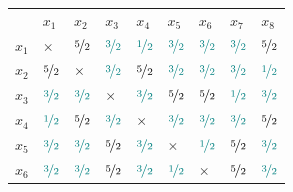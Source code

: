 \documentclass[12pt]{article}
\begin{document}
\begin{enumerate}[leftmargin=\labelsep]
        \begin{table}[h]
          \setlength{\tabcolsep}{5pt} %
          \renewcommand{\arraystretch}{1.35} %
          \centering
          \label{tab:my-table}
          \begin{tabular}{lllllllll}
                  & $x_1$                               & $x_2$                               & $x_3$                               & $x_4$                               & $x_5$                               & $x_6$                               & $x_7$                               & $x_8$                               \\
            $x_1$ & $\times$                            & $\nicefrac{5}{2}$                   & $\textcolor{teal}{\nicefrac{3}{2}}$ & $\textcolor{teal}{\nicefrac{1}{2}}$ & $\textcolor{teal}{\nicefrac{3}{2}}$ & $\textcolor{teal}{\nicefrac{3}{2}}$ & $\textcolor{teal}{\nicefrac{3}{2}}$ & $\nicefrac{5}{2}$                   \\
            $x_2$ & $\nicefrac{5}{2}$                   & $\times$                            & $\textcolor{teal}{\nicefrac{3}{2}}$ & $\nicefrac{5}{2}$                   & $\textcolor{teal}{\nicefrac{3}{2}}$ & $\textcolor{teal}{\nicefrac{3}{2}}$ & $\textcolor{teal}{\nicefrac{3}{2}}$ & $\textcolor{teal}{\nicefrac{1}{2}}$ \\
            $x_3$ & $\textcolor{teal}{\nicefrac{3}{2}}$ & $\textcolor{teal}{\nicefrac{3}{2}}$ & $\times$                            & $\textcolor{teal}{\nicefrac{3}{2}}$ & $\nicefrac{5}{2}$                   & $\nicefrac{5}{2}$                   & $\textcolor{teal}{\nicefrac{1}{2}}$ & $\textcolor{teal}{\nicefrac{3}{2}}$ \\
            $x_4$ & $\textcolor{teal}{\nicefrac{1}{2}}$ & $\nicefrac{5}{2}$                   & $\textcolor{teal}{\nicefrac{3}{2}}$ & $\times$                            & $\textcolor{teal}{\nicefrac{3}{2}}$ & $\textcolor{teal}{\nicefrac{3}{2}}$ & $\textcolor{teal}{\nicefrac{3}{2}}$ & $\nicefrac{5}{2}$                   \\
            $x_5$ & $\textcolor{teal}{\nicefrac{3}{2}}$ & $\textcolor{teal}{\nicefrac{3}{2}}$ & $\nicefrac{5}{2}$                   & $\textcolor{teal}{\nicefrac{3}{2}}$ & $\times$                            & $\textcolor{teal}{\nicefrac{1}{2}}$ & $\nicefrac{5}{2}$                   & $\textcolor{teal}{\nicefrac{3}{2}}$ \\
            $x_6$ & $\textcolor{teal}{\nicefrac{3}{2}}$ & $\textcolor{teal}{\nicefrac{3}{2}}$ & $\nicefrac{5}{2}$                   & $\textcolor{teal}{\nicefrac{3}{2}}$ & $\textcolor{teal}{\nicefrac{1}{2}}$ & $\times$                            & $\nicefrac{5}{2}$                   & $\textcolor{teal}{\nicefrac{3}{2}}$ \\

\end{tabular}
\end{table}
\end{enumerate}
\end{document}
